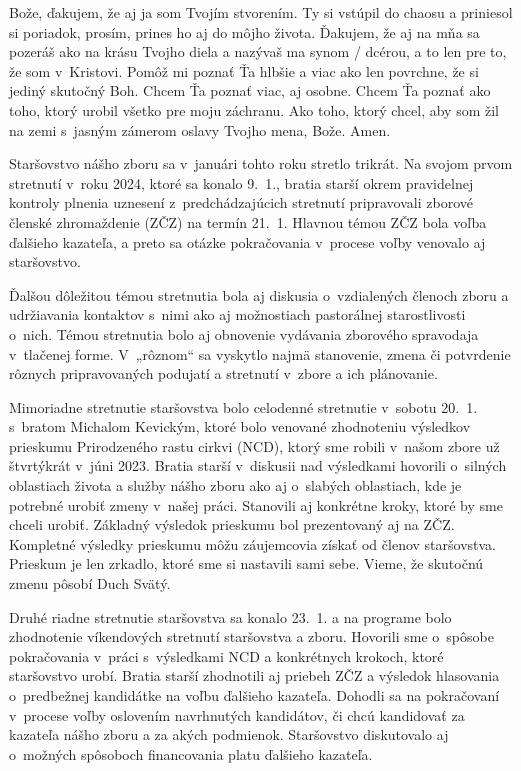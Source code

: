 Bože, ďakujem, že aj ja som Tvojím stvorením. Ty si vstúpil do chaosu a priniesol si poriadok, prosím, prines ho aj do môjho života. Ďakujem, že aj na mňa sa pozeráš ako na krásu Tvojho diela a nazývaš ma synom / dcérou, a to len pre to, že som v~Kristovi. Pomôž mi poznať Ťa hlbšie a viac ako len povrchne, že si jediný skutočný Boh. Chcem Ťa poznať viac, aj osobne. Chcem Ťa poznať ako toho, ktorý urobil všetko pre moju záchranu. Ako toho, ktorý chcel, aby som žil na zemi s~jasným zámerom oslavy Tvojho mena, Bože.
Amen.




Staršovstvo nášho zboru sa v~januári tohto roku stretlo trikrát. Na svojom prvom stretnutí v~roku 2024, ktoré sa konalo 9.~1., bratia starší okrem pravidelnej kontroly plnenia uznesení z~predchádzajúcich stretnutí pripravovali zborové členské zhromaždenie (ZČZ) na termín 21.~1. Hlavnou témou ZČZ bola voľba ďalšieho kazateľa, a preto sa otázke pokračovania v~procese voľby venovalo aj staršovstvo.

Ďalšou dôležitou témou stretnutia bola aj diskusia o~vzdialených členoch zboru a udržiavania kontaktov s~nimi ako aj možnostiach pastorálnej starostlivosti o~nich. Témou stretnutia bolo aj obnovenie vydávania zborového spravodaja v~tlačenej forme. V~„rôznom“ sa vyskytlo najmä stanovenie, zmena či potvrdenie rôznych pripravovaných podujatí a stretnutí v~zbore a ich plánovanie.

Mimoriadne stretnutie staršovstva bolo celodenné stretnutie v~sobotu 20.~1. s~bratom Michalom Kevickým, ktoré bolo venované zhodnoteniu výsledkov prieskumu Prirodzeného rastu cirkvi (NCD), ktorý sme robili v~našom zbore už štvrtýkrát v~júni 2023. Bratia starší v~diskusii nad výsledkami hovorili o~silných oblastiach života a služby nášho zboru ako aj o~slabých oblastiach, kde je potrebné urobiť zmeny v~našej práci. Stanovili aj konkrétne kroky, ktoré by sme chceli urobiť. Základný výsledok prieskumu bol prezentovaný aj na ZČZ. Kompletné výsledky prieskumu môžu záujemcovia získať od členov staršovstva. Prieskum je len zrkadlo, ktoré sme si nastavili sami sebe. Vieme, že skutočnú zmenu pôsobí Duch Svätý.

Druhé riadne stretnutie staršovstva sa konalo 23.~1. a na programe bolo zhodnotenie víkendových stretnutí staršovstva a zboru. Hovorili sme o~spôsobe pokračovania v~práci s~výsledkami NCD a konkrétnych krokoch, ktoré staršovstvo urobí. Bratia starší zhodnotili aj priebeh ZČZ a výsledok hlasovania o~predbežnej kandidátke na voľbu ďalšieho kazateľa. Dohodli sa na pokračovaní v~procese voľby oslovením navrhnutých kandidátov, či chcú kandidovať za kazateľa nášho zboru a za akých podmienok. Staršovstvo diskutovalo aj o~možných spôsoboch financovania platu ďalšieho kazateľa.

